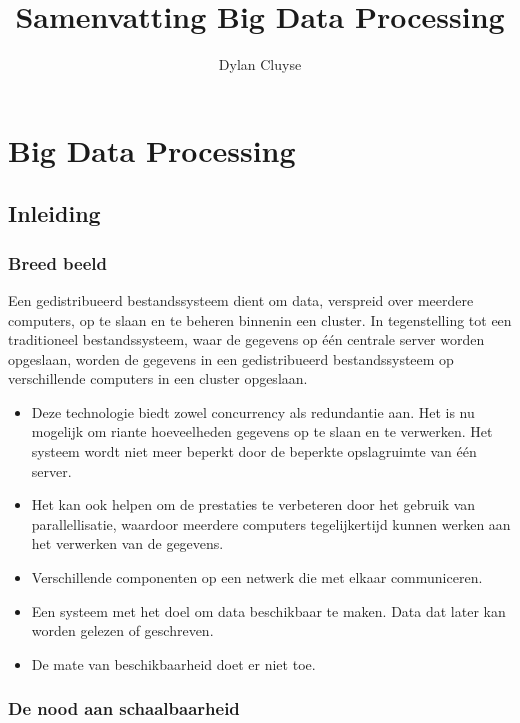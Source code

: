 \documentclass[a4paper,10pt,twoside]{report}
\title{Samenvatting Big Data Processing}
\author{Dylan {Cluyse}}
\begin{document}
	
\maketitle
	
\tableofcontents
	
\chapter{Big Data Processing}

\section{Inleiding}

\subsection{Breed beeld}

Een gedistribueerd bestandssysteem dient om data, verspreid over meerdere computers, op te slaan en te beheren binnenin een cluster. In tegenstelling tot een traditioneel bestandssysteem, waar de gegevens op één centrale server worden opgeslaan, worden de gegevens in een gedistribueerd bestandssysteem op verschillende computers in een cluster opgeslaan. 

\begin{itemize}
	\item Deze technologie biedt zowel concurrency als redundantie aan. Het is nu mogelijk om riante hoeveelheden gegevens op te slaan en te verwerken. Het systeem wordt niet meer beperkt door de beperkte opslagruimte van één server.
	\item Het kan ook helpen om de prestaties te verbeteren door het gebruik van parallellisatie, waardoor meerdere computers tegelijkertijd kunnen werken aan het verwerken van de gegevens.
	\item Verschillende componenten op een netwerk die met elkaar communiceren.
	\item Een systeem met het doel om data beschikbaar te maken. Data dat later kan worden gelezen of geschreven.
	\item De mate van beschikbaarheid doet er niet toe.
\end{itemize}

\subsection{De nood aan schaalbaarheid}
\end{document}
